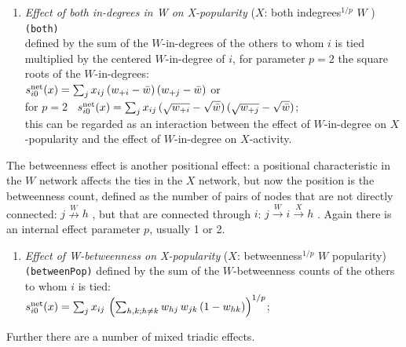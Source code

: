 \documentclass[a4paper,fleqn,11pt]{article}
\newcommand{\+}{\, + \,}
\newcommand{\vit}{\theenumi}
\newcounter{savenumi}
\begin{document}
\begin{enumerate}
 \item {\em Effect of both in-degrees in W on X-popularity } ($X$: both indegrees$^{1/p}$ $W$ ) \texttt{(both)}\\
 defined by   the sum of  the $W$-in-degrees of the others to whom $i$ is tied
 multiplied by the centered $W$-in-degree of $i$,
 for parameter $p = 2$ the square roots of the $W$-in-degrees:\\
 $s^{\rm net}_{i\vit}(x) =
   \sum_j x_{ij}\, ({w_{+i}} - {\bar w}) \, ({w_{+j}} - {\bar w})  $ or\\
for $p=2$ \  $s^{\rm net}_{i\vit}(x) =  \sum_j x_{ij}\,
 (\sqrt{w_{+i}} - \sqrt{\bar w}) \, (\sqrt{w_{+j}} - \sqrt{\bar w})  $;\\
 this can be regarded as an interaction between the effect of $W$-in-degree on $X$-popularity
 and the effect of $W$-in-degree on $X$-activity.
\setcounter{savenumi}{\value{enumi}}
\end{enumerate}
\smallskip
The betweenness effect is another positional effect:
a positional characteristic in the $W$ network affects the
ties in the $X$ network, but now the position is the betweenness count,
defined as the number of pairs of nodes that are not directly connected:
 $j \stackrel{W}{\nrightarrow} h$ ,
but that are connected through $i$:
 $j \stackrel{W}{\rightarrow} i  \stackrel{X}{\rightarrow} h$ .
 Again there is an internal effect parameter $p$, usually
1 or 2.
\begin{enumerate}
\setcounter{enumi}{\value{savenumi}}
 \item {\em Effect of W-betweenness on X-popularity } ($X$: betweenness$^{1/p}$ $W$ popularity)  \texttt{(betweenPop)}
 defined by   the sum of  the $W$-betweenness counts of the others to whom $i$ is tied:\\
 $s^{\rm net}_{i\vit}(x) =  \sum_j x_{ij}\, \left(\sum_{h,k; h \neq k}w_{hj}\,w_{jk}\,(1-w_{hk})\right)^{1/p}  $;\\
\setcounter{savenumi}{\value{enumi}}
\end{enumerate}
\smallskip
Further there are a number of mixed triadic effects.
\end{document}
